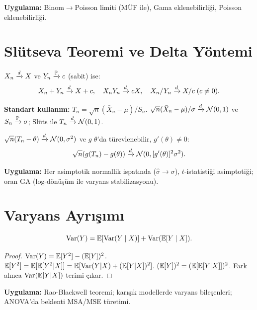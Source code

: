 \noindent\textbf{Uygulama:} Binom$\to$Poisson limiti (MÜF ile), Gama eklenebilirliği, Poisson eklenebilirliği.

\section{Slütseva Teoremi ve Delta Yöntemi}
\label{app:slutseva}

\begin{teorem}
$X_n\xrightarrow{d} X$ ve $Y_n\xrightarrow{\mathbb{P}} c$ (sabit) ise:
\[
  X_n+Y_n\xrightarrow{d} X+c, \quad X_nY_n\xrightarrow{d} cX, \quad X_n/Y_n\xrightarrow{d} X/c \;(c\neq0).
\]
\end{teorem}

\noindent\textbf{Standart kullanım:} $T_n = \sqrt{n}(\bar{X}_n-\mu)/S_n$. $\sqrt{n}(\bar{X}_n-\mu)/\sigma\xrightarrow{d}\mathcal{N}(0,1)$ ve $S_n\xrightarrow{\mathbb{P}}\sigma$; Slüts ile $T_n\xrightarrow{d}\mathcal{N}(0,1)$.

\begin{teorem}
$\sqrt{n}(T_n-\theta)\xrightarrow{d}\mathcal{N}(0,\sigma^2)$ ve $g$ $\theta$'da türevlenebilir, $g'(\theta)\neq0$:
\[
  \sqrt{n}(g(T_n)-g(\theta))\xrightarrow{d}\mathcal{N}(0,[g'(\theta)]^2\sigma^2).
\]
\end{teorem}

\noindent\textbf{Uygulama:} Her asimptotik normallik ispatında ($\hat\sigma\to\sigma$), $t$-istatistiği asimptotiği; oran GA (log-dönüşüm ile varyans stabilizasyonu).

\section{Varyans Ayrışımı}
\label{app:varyans_ayrisim}

\[
  \operatorname{Var}(Y) = \mathbb{E}[\operatorname{Var}(Y\mid X)] + \operatorname{Var}(\mathbb{E}[Y\mid X]).
\]

\begin{proof}
$\operatorname{Var}(Y) = \mathbb{E}[Y^2]-(\mathbb{E}[Y])^2$. $\mathbb{E}[Y^2]=\mathbb{E}[\mathbb{E}[Y^2|X]]=\mathbb{E}[\operatorname{Var}(Y|X)+(\mathbb{E}[Y|X])^2]$. $(\mathbb{E}[Y])^2=(\mathbb{E}[\mathbb{E}[Y|X]])^2$. Fark alınca $\operatorname{Var}(\mathbb{E}[Y|X])$ terimi çıkar.
\end{proof}

\noindent\textbf{Uygulama:} Rao-Blackwell teoremi; karışık modellerde varyans bileşenleri; ANOVA'da beklenti MSA/MSE türetimi.

